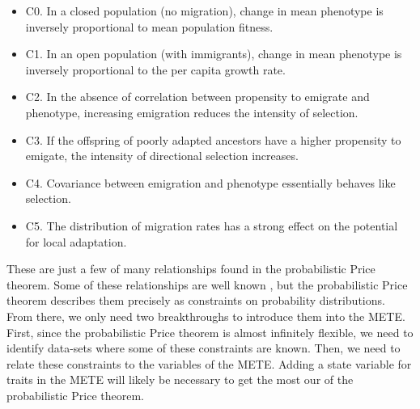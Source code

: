\documentclass[letterpaper,12pt]{article}
\begin{document}
\begin{itemize}

  \item C0. In a closed population (no migration), change in mean phenotype is
  inversely proportional to mean population fitness.

  \item C1. In an open population (with immigrants), change in mean phenotype is
  inversely proportional to the per capita growth rate.

  \item C2. In the absence of correlation between propensity to emigrate and
  phenotype, increasing emigration reduces the intensity of selection.

  \item C3. If the offspring of poorly adapted ancestors have a higher
  propensity to emigate, the intensity of directional selection increases.

  \item C4. Covariance between emigration and phenotype essentially behaves like
  selection.

  \item C5. The distribution of migration rates has a strong effect on the
  potential for local adaptation.

\end{itemize}

These are just a few of many relationships found in the probabilistic Price
theorem. Some of these relationships are well known \cite{hed04,cha11b}, but
the probabilistic Price theorem describes them precisely as constraints on
probability distributions. From there, we only need two breakthroughs to
introduce them into the METE. First, since the probabilistic Price theorem
is almost infinitely flexible, we need to identify data-sets where some of
these constraints are known. Then, we need to relate these constraints to
the variables of the METE. Adding a state variable for traits in the METE
will likely be necessary to get the most our of the probabilistic Price
theorem.
\end{document}
